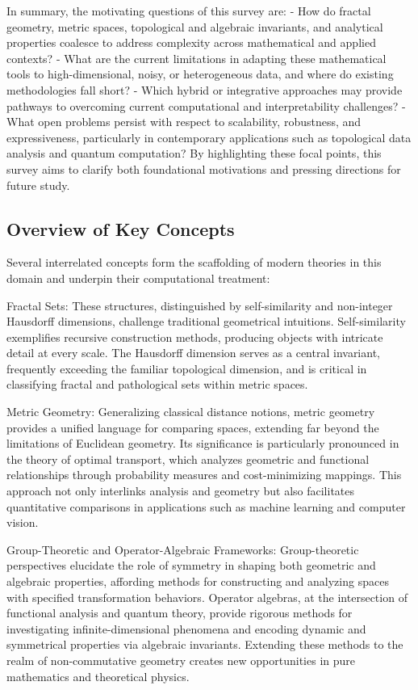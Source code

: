 \documentclass[sigconf]{acmart}
\begin{document}
In summary, the motivating questions of this survey are:
- How do fractal geometry, metric spaces, topological and algebraic invariants, and analytical properties coalesce to address complexity across mathematical and applied contexts?
- What are the current limitations in adapting these mathematical tools to high-dimensional, noisy, or heterogeneous data, and where do existing methodologies fall short?
- Which hybrid or integrative approaches may provide pathways to overcoming current computational and interpretability challenges?
- What open problems persist with respect to scalability, robustness, and expressiveness, particularly in contemporary applications such as topological data analysis and quantum computation?
By highlighting these focal points, this survey aims to clarify both foundational motivations and pressing directions for future study.

\subsection{Overview of Key Concepts}

Several interrelated concepts form the scaffolding of modern theories in this domain and underpin their computational treatment:

Fractal Sets: These structures, distinguished by self-similarity and non-integer Hausdorff dimensions, challenge traditional geometrical intuitions. Self-similarity exemplifies recursive construction methods, producing objects with intricate detail at every scale. The Hausdorff dimension serves as a central invariant, frequently exceeding the familiar topological dimension, and is critical in classifying fractal and pathological sets within metric spaces.

Metric Geometry: Generalizing classical distance notions, metric geometry provides a unified language for comparing spaces, extending far beyond the limitations of Euclidean geometry. Its significance is particularly pronounced in the theory of optimal transport, which analyzes geometric and functional relationships through probability measures and cost-minimizing mappings. This approach not only interlinks analysis and geometry but also facilitates quantitative comparisons in applications such as machine learning and computer vision.

Group-Theoretic and Operator-Algebraic Frameworks: Group-theoretic perspectives elucidate the role of symmetry in shaping both geometric and algebraic properties, affording methods for constructing and analyzing spaces with specified transformation behaviors. Operator algebras, at the intersection of functional analysis and quantum theory, provide rigorous methods for investigating infinite-dimensional phenomena and encoding dynamic and symmetrical properties via algebraic invariants. Extending these methods to the realm of non-commutative geometry creates new opportunities in pure mathematics and theoretical physics.
\end{document}
